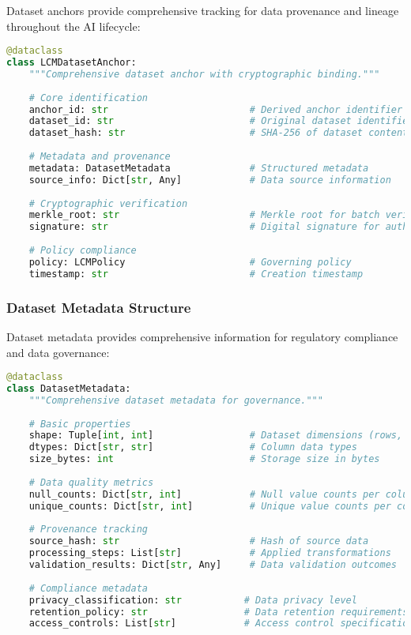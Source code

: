 \documentclass[12pt,a4paper]{article}
\begin{document}
Dataset anchors provide comprehensive tracking for data provenance and lineage throughout the AI lifecycle:

\begin{lstlisting}[language=Python, caption=Dataset Anchor Structure]
@dataclass
class LCMDatasetAnchor:
    """Comprehensive dataset anchor with cryptographic binding."""
    
    # Core identification
    anchor_id: str                         # Derived anchor identifier
    dataset_id: str                        # Original dataset identifier
    dataset_hash: str                      # SHA-256 of dataset content
    
    # Metadata and provenance
    metadata: DatasetMetadata              # Structured metadata
    source_info: Dict[str, Any]            # Data source information
    
    # Cryptographic verification
    merkle_root: str                       # Merkle root for batch verification
    signature: str                         # Digital signature for authenticity
    
    # Policy compliance
    policy: LCMPolicy                      # Governing policy
    timestamp: str                         # Creation timestamp
\end{lstlisting}

\subsubsection{Dataset Metadata Structure}

Dataset metadata provides comprehensive information for regulatory compliance and data governance:

\begin{lstlisting}[language=Python, caption=Dataset Metadata Structure]
@dataclass
class DatasetMetadata:
    """Comprehensive dataset metadata for governance."""
    
    # Basic properties
    shape: Tuple[int, int]                 # Dataset dimensions (rows, columns)
    dtypes: Dict[str, str]                 # Column data types
    size_bytes: int                        # Storage size in bytes
    
    # Data quality metrics
    null_counts: Dict[str, int]            # Null value counts per column
    unique_counts: Dict[str, int]          # Unique value counts per column
    
    # Provenance tracking
    source_hash: str                       # Hash of source data
    processing_steps: List[str]            # Applied transformations
    validation_results: Dict[str, Any]     # Data validation outcomes
    
    # Compliance metadata
    privacy_classification: str           # Data privacy level
    retention_policy: str                 # Data retention requirements
    access_controls: List[str]            # Access control specifications
\end{lstlisting}
\end{document}
